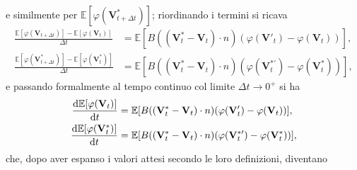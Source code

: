                 e similmente per \(\mathbb E[\varphi(\mathbf V^*_{t+\Delta t})]\); riordinando i termini si ricava
                \begin{equation*}
                    \begin{aligned}
                        \frac{\mathbb E[\varphi(\mathbf V_{t+\Delta t})]-\mathbb E[\varphi(\mathbf V_t)]}{\Delta t}
                        &=\mathbb E[B((\mathbf V^*_t-\mathbf V_t)\cdot n)(\varphi(\mathbf V'_t)-\varphi(\mathbf V_t))],\\
                        \frac{\mathbb E[\varphi(\mathbf V^*_{t+\Delta t})]-\mathbb E[\varphi(\mathbf V^*_t)]}{\Delta t}
                        &=\mathbb E[B((\mathbf V^*_t-\mathbf V_t)\cdot n)(\varphi(\mathbf V^{*\prime}_t)-\varphi(\mathbf V^*_t))],
                    \end{aligned}
                \end{equation*}
                e passando formalmente al tempo continuo col limite \(\Delta t\to0^+\)\footnotemark{} si ha
                \begin{equation*}
                    \begin{aligned}
                        \frac{\mathrm{d}\mathbb E[\varphi(\mathbf V_t)]}{\mathrm{d}t}
                        &=\mathbb E[B((\mathbf V^*_t-\mathbf V_t)\cdot n)(\varphi(\mathbf V'_t)-\varphi(\mathbf V_t))],\\
                        \frac{\mathrm{d}\mathbb E[\varphi(\mathbf V^*_t)]}{\mathrm{d}t}
                        &=\mathbb E[B((\mathbf V^*_t-\mathbf V_t)\cdot n)(\varphi(\mathbf V^{*\prime}_t)-\varphi(\mathbf V^*_t))],
                    \end{aligned}
                \end{equation*}
                che, dopo aver espanso i valori attesi secondo le loro definizioni, diventano
